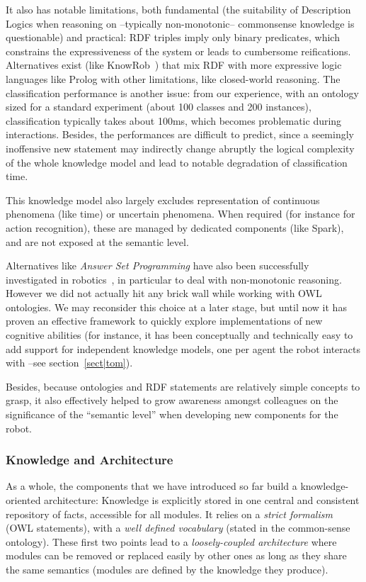 \documentclass[preprint,3p,times]{elsarticle}
\begin{document}
It also has notable limitations, both fundamental (the suitability of
Description Logics when reasoning on --typically non-monotonic-- commonsense
knowledge is questionable) and practical: RDF triples imply only binary
predicates, which constrains the expressiveness of the system or leads to
cumbersome reifications. Alternatives exist (like {\sc
KnowRob}~\cite{Tenorth2009a}) that mix RDF with more expressive logic languages
like {\sc Prolog} with other limitations, like closed-world reasoning. The
classification performance is another issue: from our experience, with an
ontology sized for a standard experiment (about 100 classes and 200 instances),
classification typically takes about 100ms, which becomes problematic during
interactions.  Besides, the performances are difficult to predict, since a
seemingly inoffensive new statement may indirectly change abruptly the logical
complexity of the whole knowledge model and lead to notable degradation of
classification time.

This knowledge model also largely excludes representation of continuous
phenomena (like time) or uncertain phenomena. When required (for instance for
action recognition), these are managed by dedicated components (like {\sc
Spark}), and are not exposed at the semantic level.

Alternatives like \emph{Answer Set Programming} have also been
successfully investigated in robotics~\cite{Chen2010,Erdem2012}, in particular
to deal with non-monotonic reasoning. However we did not actually hit any brick wall
while working with OWL ontologies. We may reconsider this choice at a later
stage, but until now it has proven an effective framework to quickly explore
implementations of new cognitive abilities (for instance, it has been
conceptually and technically easy to add support for independent knowledge
models, one per agent the robot interacts with --see section~\ref{sect|tom}).

Besides, because ontologies and RDF statements are relatively simple concepts
to grasp, it also effectively helped to grow awareness amongst colleagues on
the significance of the ``semantic level'' when developing new components for
the robot.

\subsubsection{Knowledge and Architecture}

As a whole, the components that we have introduced so far build a
knowledge-oriented architecture: Knowledge is explicitly stored in one central
and consistent repository of facts, accessible for all modules. It relies on a
\emph{strict formalism} (OWL statements), with a \emph{well defined vocabulary}
(stated in the common-sense ontology). These first two points lead to a
\emph{loosely-coupled architecture} where modules can be removed or replaced
easily by other ones as long as they share the same semantics (modules are
defined by the knowledge they produce).
\end{document}
